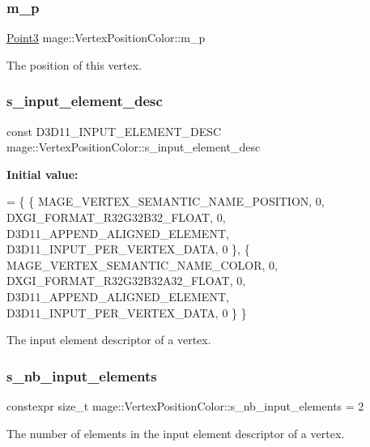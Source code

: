 \subsubsection{\texorpdfstring{m\+\_\+p}{m\_p}}
{\footnotesize\ttfamily \hyperlink{structmage_1_1_point3}{Point3} mage\+::\+Vertex\+Position\+Color\+::m\+\_\+p}

The position of this vertex. \hypertarget{structmage_1_1_vertex_position_color_a0cc09950718850b64339c5fd5130ff9a}{}\label{structmage_1_1_vertex_position_color_a0cc09950718850b64339c5fd5130ff9a} 
\subsubsection{\texorpdfstring{s\+\_\+input\+\_\+element\+\_\+desc}{s\_input\_element\_desc}}
{\footnotesize\ttfamily const D3\+D11\+\_\+\+I\+N\+P\+U\+T\+\_\+\+E\+L\+E\+M\+E\+N\+T\+\_\+\+D\+E\+SC mage\+::\+Vertex\+Position\+Color\+::s\+\_\+input\+\_\+element\+\_\+desc\hspace{0.3cm}{\ttfamily [static]}}

{\bfseries Initial value\+:}
\begin{DoxyCode}
= \{
        \{ MAGE\_VERTEX\_SEMANTIC\_NAME\_POSITION, 0, DXGI\_FORMAT\_R32G32B32\_FLOAT,    0, 
      D3D11\_APPEND\_ALIGNED\_ELEMENT, D3D11\_INPUT\_PER\_VERTEX\_DATA, 0 \},
        \{ MAGE\_VERTEX\_SEMANTIC\_NAME\_COLOR,    0, DXGI\_FORMAT\_R32G32B32A32\_FLOAT, 0, 
      D3D11\_APPEND\_ALIGNED\_ELEMENT, D3D11\_INPUT\_PER\_VERTEX\_DATA, 0 \}
    \}
\end{DoxyCode}
The input element descriptor of a vertex. \hypertarget{structmage_1_1_vertex_position_color_aca312c5c3837431ffa49cd3461426f96}{}\label{structmage_1_1_vertex_position_color_aca312c5c3837431ffa49cd3461426f96} 
\subsubsection{\texorpdfstring{s\+\_\+nb\+\_\+input\+\_\+elements}{s\_nb\_input\_elements}}
{\footnotesize\ttfamily constexpr size\+\_\+t mage\+::\+Vertex\+Position\+Color\+::s\+\_\+nb\+\_\+input\+\_\+elements = 2\hspace{0.3cm}{\ttfamily [static]}}

The number of elements in the input element descriptor of a vertex. 
